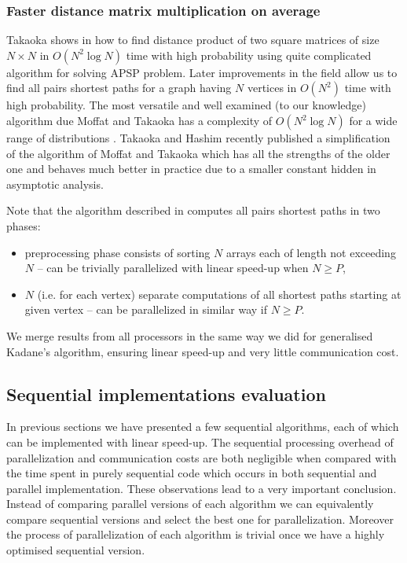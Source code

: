 \subsubsection*{Faster distance matrix multiplication on average}

Takaoka shows in \cite{TakaokaMSA} how to find distance product of two square matrices of size $N \times N$ in $O(N^2 \log{N})$ time with high probability using quite complicated algorithm for solving APSP problem.
Later improvements in the field allow us to find all pairs shortest paths for a graph having $N$ vertices in $O(N^2)$ time with high probability.
The most versatile and well examined (to our knowledge) algorithm due Moffat and Takaoka has a complexity of $O(N^2 \log{N})$ for a wide range of distributions \cite{MoffatTakaoka}.
Takaoka and Hashim recently published \cite{TakaokaHashim} a simplification of the algorithm of Moffat and Takaoka which has all the strengths of the older one and behaves much better in practice due to a smaller constant hidden in asymptotic analysis.

Note that the algorithm described in \cite{TakaokaHashim} computes all pairs shortest paths in two phases:
\begin{itemize}
    \item preprocessing phase consists of sorting $N$ arrays each of length not exceeding $N$ -- can be trivially parallelized with linear speed-up when $N \geq P$,
    \item $N$ (i.e. for each vertex) separate computations of all shortest paths starting at given vertex -- can be parallelized in similar way if $N \geq P$.
\end{itemize}
We merge results from all processors in the same way we did for generalised Kadane's algorithm, ensuring linear speed-up and very little communication cost.

\subsection*{Sequential implementations evaluation}

In previous sections we have presented a few sequential algorithms, each of which can be implemented with linear speed-up.
The sequential processing overhead of parallelization and communication costs are both negligible when compared with the time spent in purely sequential code which occurs in both sequential and parallel implementation.
These observations lead to a very important conclusion.
Instead of comparing parallel versions of each algorithm we can equivalently compare sequential versions and select the best one for parallelization.
Moreover the process of parallelization of each algorithm is trivial once we have a highly optimised sequential version.

